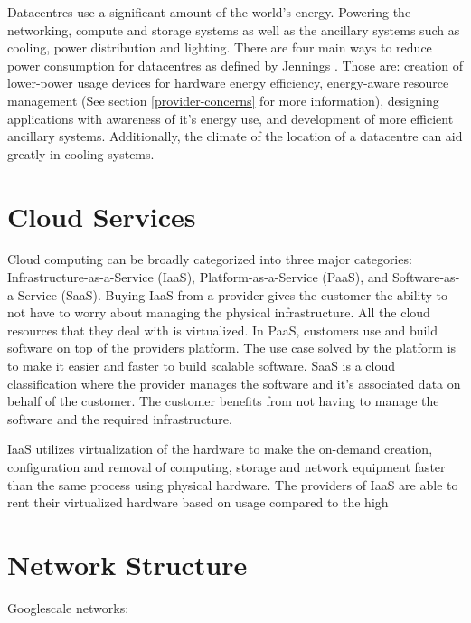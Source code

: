\documentclass[fullapage,12pt]{article}
\begin{document}
Datacentres use a significant amount of the world's energy. Powering the networking, compute and storage systems as well as the ancillary systems such as cooling, power distribution and lighting.
There are four main ways to reduce power consumption for datacentres as defined by Jennings \cite{Jennings2015}. Those are: creation of lower-power usage devices for hardware energy efficiency, energy-aware resource management (See section \ref{provider-concerns} for more information), designing applications with awareness of it's energy use, and development of more efficient ancillary systems. Additionally, the climate of the location of a datacentre can aid greatly in cooling systems.


\section{Cloud Services} \label{sec:cloud-services}


Cloud computing can be broadly categorized into three major categories: Infrastructure-as-a-Service (IaaS), Platform-as-a-Service (PaaS), and Software-as-a-Service (SaaS). Buying IaaS from a provider gives the customer the ability to not have to worry about managing the physical infrastructure. All the cloud resources that they deal with is virtualized. In PaaS, customers use and build software on top of the providers platform. The use case solved by the platform is to make it easier and faster to build scalable software. SaaS is a cloud classification where the provider manages the software and it's associated data on behalf of the customer. The customer benefits from not having to manage the software and the required infrastructure.

IaaS utilizes virtualization of the hardware to make the on-demand creation, configuration and removal of computing, storage and network equipment faster than the same process using physical hardware. The providers of IaaS are able to rent their virtualized hardware based on usage compared to the high


\section{Network Structure} \label{sec:network-structure}

Googlescale networks: \cite{singh2015jupiter} %
\end{document}

